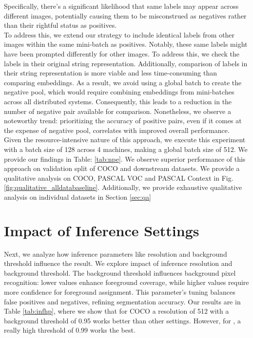 Specifically, there's a significant likelihood that same labels may appear across different images, potentially causing them to be misconstrued as negatives rather than their rightful status as positives.\\
To address this, we extend our strategy to include identical labels from other images within the same mini-batch as positives. Notably, these same labels might have been prompted differently for other images. To address this, we check the labels in their original string representation. Additionally, comparison of labels in their string representation is more viable and less time-consuming than comparing embeddings. As a result, we avoid using a global batch to create the negative pool, which would require combining embeddings from mini-batches across all distributed systems.
Consequently, this leads to a reduction in the number of negative pair available for comparison. Nonetheless, we observe a noteworthy trend: prioritizing the accuracy of positive pairs, even if it comes at the expense of negative pool, correlates with improved overall performance.\\
Given the resource-intensive nature of this approach, we execute this experiment with a batch size of 128 across 4 machines, making a global batch size of 512. 
We provide our findings in Table: \ref{tab:npe}. We observe superior performance of this approach on validation split of COCO and downstream datasets. We provide a qualitative analysis on COCO, PASCAL VOC and PASCAL Context in Fig. \ref{fig:qualitative_alldatabaseline}. Additionally, we provide exhaustive qualitative analysis on individual datasets in Section \ref{sec:qa}





\section{Impact of Inference Settings}
\label{sec:infsettings}

Next, we analyze how inference parameters like resolution and background threshold influence the result. We explore impact of inference resolution and background threshold. The background threshold influences background pixel recognition: lower values enhance foreground coverage, while higher values require more confidence for foreground assignment. This parameter's tuning balances false positives and negatives, refining segmentation accuracy. Our results are in Table \ref{tab:infhp}, where we show that for COCO a resolution of 512 with a background threshold of 0.95 works better than other settings. However, for \pvoc, a really high threshold of 0.99 works the best.




